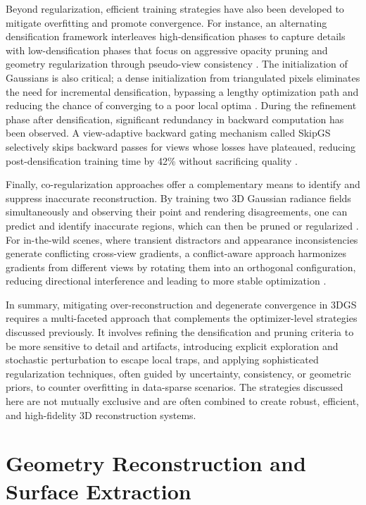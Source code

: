 \documentclass[11pt]{article}
\begin{document}
Beyond regularization, efficient training strategies have also been developed to mitigate overfitting and promote convergence. For instance, an alternating densification framework interleaves high-densification phases to capture details with low-densification phases that focus on aggressive opacity pruning and geometry regularization through pseudo-view consistency \cite{ref179}. The initialization of Gaussians is also critical; a dense initialization from triangulated pixels eliminates the need for incremental densification, bypassing a lengthy optimization path and reducing the chance of converging to a poor local optima \cite{ref138}. During the refinement phase after densification, significant redundancy in backward computation has been observed. A view-adaptive backward gating mechanism called SkipGS selectively skips backward passes for views whose losses have plateaued, reducing post-densification training time by 42\% without sacrificing quality \cite{ref180}.

Finally, co-regularization approaches offer a complementary means to identify and suppress inaccurate reconstruction. By training two 3D Gaussian radiance fields simultaneously and observing their point and rendering disagreements, one can predict and identify inaccurate regions, which can then be pruned or regularized \cite{ref181}. For in-the-wild scenes, where transient distractors and appearance inconsistencies generate conflicting cross-view gradients, a conflict-aware approach harmonizes gradients from different views by rotating them into an orthogonal configuration, reducing directional interference and leading to more stable optimization \cite{ref182}.

In summary, mitigating over-reconstruction and degenerate convergence in 3DGS requires a multi-faceted approach that complements the optimizer-level strategies discussed previously. It involves refining the densification and pruning criteria to be more sensitive to detail and artifacts, introducing explicit exploration and stochastic perturbation to escape local traps, and applying sophisticated regularization techniques, often guided by uncertainty, consistency, or geometric priors, to counter overfitting in data-sparse scenarios. The strategies discussed here are not mutually exclusive and are often combined to create robust, efficient, and high-fidelity 3D reconstruction systems.

\section{Geometry Reconstruction and Surface Extraction}
\end{document}
